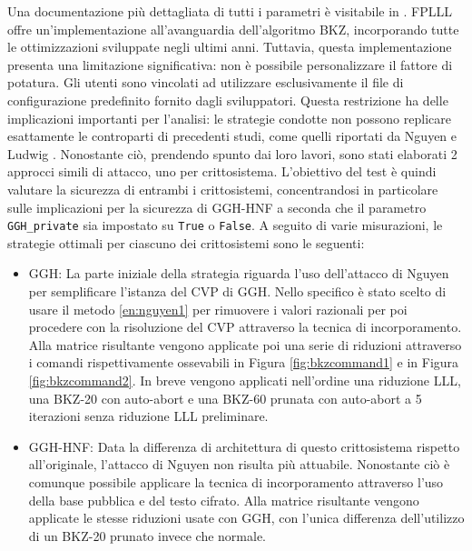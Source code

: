 Una documentazione più dettagliata di tutti i parametri è visitabile in \cite{FPLLL}.
FPLLL offre un'implementazione all'avanguardia dell'algoritmo BKZ, incorporando tutte le 
ottimizzazioni sviluppate negli ultimi anni. Tuttavia, questa implementazione presenta 
una limitazione significativa: non è possibile personalizzare il fattore di potatura. 
Gli utenti sono vincolati ad utilizzare esclusivamente il file di configurazione 
predefinito fornito dagli sviluppatori. 
Questa restrizione ha delle implicazioni importanti per l'analisi: le strategie condotte
non possono replicare esattamente le controparti di 
precedenti studi, come quelli riportati da Nguyen \cite{Nguyen99} e Ludwig \cite{HNF04}.
Nonostante ciò, prendendo spunto dai loro lavori, sono stati elaborati 2 approcci simili
di attacco, uno per crittosistema. 
L'obiettivo del test è quindi valutare la sicurezza di entrambi i crittosistemi, 
concentrandosi in particolare sulle implicazioni per la sicurezza di GGH-HNF a 
seconda che il parametro \texttt{GGH\_private} sia impostato su \texttt{True} o 
\texttt{False}. A seguito di varie misurazioni, le strategie ottimali per ciascuno dei 
crittosistemi sono le seguenti:
\begin{itemize}
    \item GGH: La parte iniziale della strategia riguarda l'uso dell'attacco di Nguyen per semplificare
    l'istanza del CVP di GGH. Nello specifico è stato scelto di usare il metodo \ref{en:nguyen1} per 
    rimuovere i valori razionali per poi procedere con la risoluzione del CVP attraverso 
    la tecnica di incorporamento.
    Alla matrice risultante vengono applicate poi una serie di riduzioni attraverso i 
    comandi rispettivamente ossevabili in
    Figura \ref{fig:bkzcommand1} e in Figura \ref{fig:bkzcommand2}. In breve vengono 
    applicati nell'ordine una riduzione LLL, una BKZ-20 con auto-abort e una BKZ-60 prunata
    con auto-abort a 5 iterazioni senza riduzione LLL preliminare. 
    \item GGH-HNF: Data la differenza di 
    architettura di questo crittosistema rispetto all'originale, 
    l'attacco di Nguyen non risulta più attuabile. Nonostante ciò 
    è comunque possibile applicare la tecnica di incorporamento attraverso l'uso della 
    base pubblica e del testo cifrato. Alla matrice risultante vengono applicate le stesse
    riduzioni usate con GGH, con l'unica differenza dell'utilizzo di un BKZ-20 prunato invece
    che normale. 
\end{itemize}

